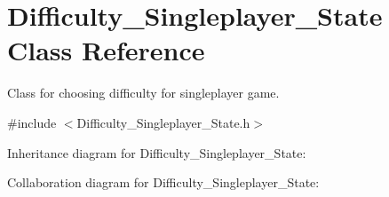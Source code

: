 \hypertarget{classDifficulty__Singleplayer__State}{}\section{Difficulty\+\_\+\+Singleplayer\+\_\+\+State Class Reference}
\label{classDifficulty__Singleplayer__State}


Class for choosing difficulty for singleplayer game.  




{\ttfamily \#include $<$Difficulty\+\_\+\+Singleplayer\+\_\+\+State.\+h$>$}



Inheritance diagram for Difficulty\+\_\+\+Singleplayer\+\_\+\+State\+:


Collaboration diagram for Difficulty\+\_\+\+Singleplayer\+\_\+\+State\+:
